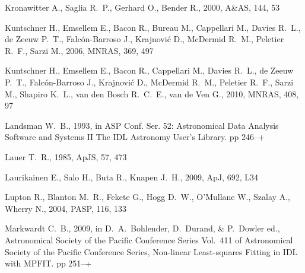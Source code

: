 \documentclass[usenatbib,usegraphicx]{mn2e}
\def\apjl{ApJ}          %
\def\apjs{ApJS}         %
\def\aaps{A\&AS}        %
\def\mnras{MNRAS}       %
\def\pasp{PASP}         %
\begin{document}
\begin{thebibliography}{}
{Kronawitter} A.,  {Saglia} R.~P.,  {Gerhard} O.,    {Bender} R.,  2000, \aaps,
  144, 53

{Kuntschner} H.,  {Emsellem} E.,  {Bacon} R.,  {Bureau} M.,  {Cappellari} M.,
  {Davies} R.~L.,  {de Zeeuw} P.~T.,  {Falc{\'o}n-Barroso} J.,  {Krajnovi{\'c}}
  D.,  {McDermid} R.~M.,  {Peletier} R.~F.,    {Sarzi} M.,  2006, \mnras, 369,
  497

{Kuntschner} H.,  {Emsellem} E.,  {Bacon} R.,  {Cappellari} M.,  {Davies}
  R.~L.,  {de Zeeuw} P.~T.,  {Falc{\'o}n-Barroso} J.,  {Krajnovi{\'c}} D.,
  {McDermid} R.~M.,  {Peletier} R.~F.,  {Sarzi} M.,  {Shapiro} K.~L.,  {van den
  Bosch} R.~C.~E.,    {van de Ven} G.,  2010, \mnras, 408, 97

{Landsman} W.~B.,  1993, in ASP Conf. Ser. 52: Astronomical Data Analysis
  Software and Systems II {The IDL Astronomy User's Library}.
pp 246--+

{Lauer} T.~R.,  1985, \apjs, 57, 473

{Laurikainen} E.,  {Salo} H.,  {Buta} R.,    {Knapen} J.~H.,  2009, \apjl, 692,
  L34

{Lupton} R.,  {Blanton} M.~R.,  {Fekete} G.,  {Hogg} D.~W.,  {O'Mullane} W.,
  {Szalay} A.,    {Wherry} N.,  2004, \pasp, 116, 133

{Markwardt} C.~B.,  2009, in {D.~A.~Bohlender, D.~Durand, \& P.~Dowler} ed.,
  Astronomical Society of the Pacific Conference Series Vol.~411 of
  Astronomical Society of the Pacific Conference Series, {Non-linear
  Least-squares Fitting in IDL with MPFIT}.
pp 251--+


\end{thebibliography}
\end{document}
